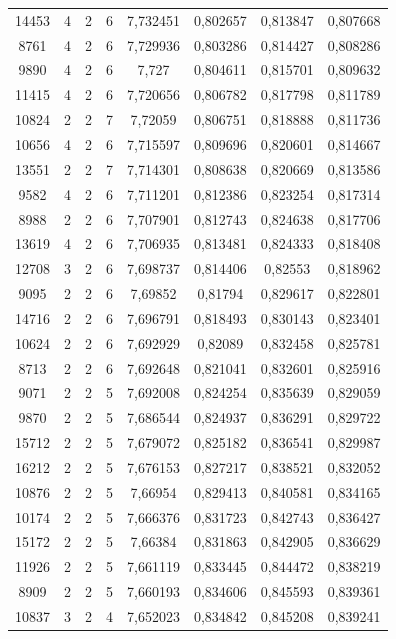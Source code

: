 \begin{longtable}{|c|c|c|c|c|c|c|c|}
14453 & 4 & 2 & 6 & 7,732451 & 0,802657 & 0,813847 & 0,807668 \\
8761 & 4 & 2 & 6 & 7,729936 & 0,803286 & 0,814427 & 0,808286 \\
9890 & 4 & 2 & 6 & 7,727 & 0,804611 & 0,815701 & 0,809632 \\
11415 & 4 & 2 & 6 & 7,720656 & 0,806782 & 0,817798 & 0,811789 \\
10824 & 2 & 2 & 7 & 7,72059 & 0,806751 & 0,818888 & 0,811736 \\
10656 & 4 & 2 & 6 & 7,715597 & 0,809696 & 0,820601 & 0,814667 \\
13551 & 2 & 2 & 7 & 7,714301 & 0,808638 & 0,820669 & 0,813586 \\
9582 & 4 & 2 & 6 & 7,711201 & 0,812386 & 0,823254 & 0,817314 \\
8988 & 2 & 2 & 6 & 7,707901 & 0,812743 & 0,824638 & 0,817706 \\
13619 & 4 & 2 & 6 & 7,706935 & 0,813481 & 0,824333 & 0,818408 \\
12708 & 3 & 2 & 6 & 7,698737 & 0,814406 & 0,82553 & 0,818962 \\
9095 & 2 & 2 & 6 & 7,69852 & 0,81794 & 0,829617 & 0,822801 \\
14716 & 2 & 2 & 6 & 7,696791 & 0,818493 & 0,830143 & 0,823401 \\
10624 & 2 & 2 & 6 & 7,692929 & 0,82089 & 0,832458 & 0,825781 \\
8713 & 2 & 2 & 6 & 7,692648 & 0,821041 & 0,832601 & 0,825916 \\
9071 & 2 & 2 & 5 & 7,692008 & 0,824254 & 0,835639 & 0,829059 \\
9870 & 2 & 2 & 5 & 7,686544 & 0,824937 & 0,836291 & 0,829722 \\
15712 & 2 & 2 & 5 & 7,679072 & 0,825182 & 0,836541 & 0,829987 \\
16212 & 2 & 2 & 5 & 7,676153 & 0,827217 & 0,838521 & 0,832052 \\
10876 & 2 & 2 & 5 & 7,66954 & 0,829413 & 0,840581 & 0,834165 \\
10174 & 2 & 2 & 5 & 7,666376 & 0,831723 & 0,842743 & 0,836427 \\
15172 & 2 & 2 & 5 & 7,66384 & 0,831863 & 0,842905 & 0,836629 \\
11926 & 2 & 2 & 5 & 7,661119 & 0,833445 & 0,844472 & 0,838219 \\
8909 & 2 & 2 & 5 & 7,660193 & 0,834606 & 0,845593 & 0,839361 \\
10837 & 3 & 2 & 4 & 7,652023 & 0,834842 & 0,845208 & 0,839241 \\

\end{longtable}
